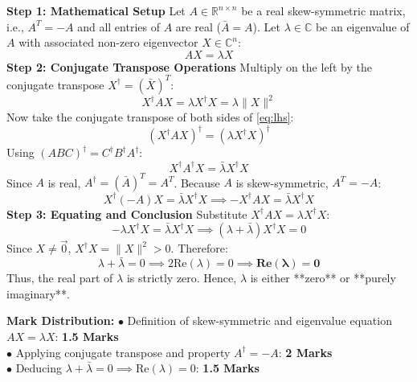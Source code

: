 \begin{solutionbox}
\textbf{Step 1: Mathematical Setup}
Let $A \in \mathbb{R}^{n\times n}$ be a real skew-symmetric matrix, i.e., $A^T = -A$ and all entries of $A$ are real ($\bar{A} = A$).
Let $\lambda \in \mathbb{C}$ be an eigenvalue of $A$ with associated non-zero eigenvector $X \in \mathbb{C}^n$:
\[
A X = \lambda X \label{eq:eigen}
\]
\textbf{Step 2: Conjugate Transpose Operations}
Multiply on the left by the conjugate transpose $X^\dagger = (\bar{X})^T$:
\[
X^\dagger A X = \lambda X^\dagger X = \lambda \|X\|^2 \label{eq:lhs}
\]
Now take the conjugate transpose of both sides of \eqref{eq:lhs}:
\[
(X^\dagger A X)^\dagger = (\lambda X^\dagger X)^\dagger
\]
Using $(ABC)^\dagger = C^\dagger B^\dagger A^\dagger$:
\[
X^\dagger A^\dagger X = \bar{\lambda} X^\dagger X
\]
Since $A$ is real, $A^\dagger = (\bar{A})^T = A^T$. Because $A$ is skew-symmetric, $A^T = -A$:
\[
X^\dagger (-A) X = \bar{\lambda} X^\dagger X \implies - X^\dagger A X = \bar{\lambda} X^\dagger X
\]
\textbf{Step 3: Equating and Conclusion}
Substitute $X^\dagger A X = \lambda X^\dagger X$:
\[
-\lambda X^\dagger X = \bar{\lambda} X^\dagger X \implies (\lambda + \bar{\lambda}) X^\dagger X = 0
\]
Since $X \neq \vec{0}$, $X^\dagger X = \|X\|^2 > 0$. Therefore:
\[
\lambda + \bar{\lambda} = 0 \implies 2 \text{Re}(\lambda) = 0 \implies \mathbf{\text{Re}(\lambda) = 0}
\]
Thus, the real part of $\lambda$ is strictly zero. Hence, $\lambda$ is either **zero** or **purely imaginary**.

\begin{markingrubric}
\textbf{Mark Distribution:}
$\bullet$ Definition of skew-symmetric and eigenvalue equation $AX = \lambda X$: \textbf{1.5 Marks}\\
$\bullet$ Applying conjugate transpose and property $A^\dagger = -A$: \textbf{2 Marks}\\
$\bullet$ Deducing $\lambda + \bar{\lambda} = 0 \implies \text{Re}(\lambda) = 0$: \textbf{1.5 Marks}
\end{markingrubric}
\end{solutionbox}

\newpage
